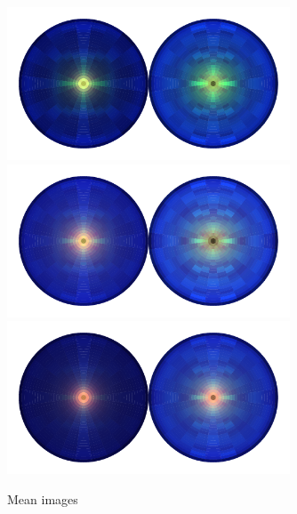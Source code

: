\begin{figure}[h!]
    \includegraphics[width=0.75\textwidth]{figures/appendix_VBFLPS/mean_vbf_LPS_uw.pdf}
    \includegraphics[width=0.75\textwidth]{figures/appendix_VBFLPS/mean_ggh_LPS_uw.pdf}
    \includegraphics[width=0.75\textwidth]{figures/appendix_VBFLPS/mean_bkg_LPS_uw.pdf}
    \caption{Mean images}
    \label{fig:vbf_lps_appendix:mean_jet_image}
\end{figure}






